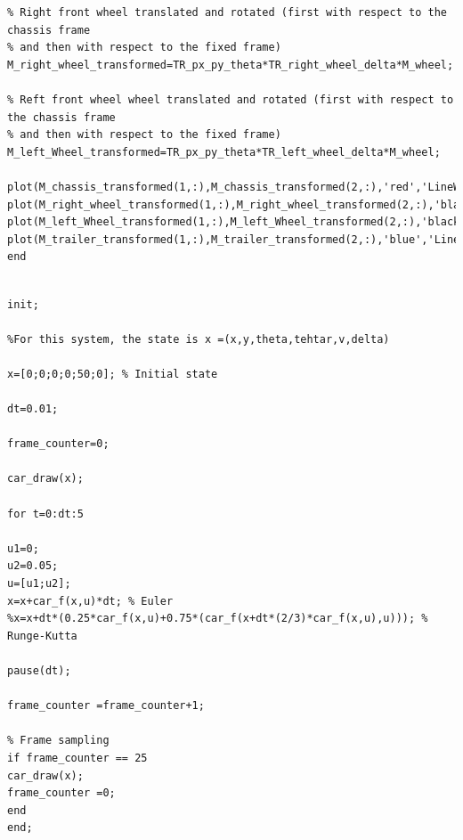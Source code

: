 \documentclass{article}
\begin{document}
\begin{tcolorbox}[
        title={File \texttt{car\_trailer\_draw.m}},
        width=13cm,
    ]
\begin{scriptsize}
\begin{verbatim}
% Right front wheel translated and rotated (first with respect to the chassis frame 
% and then with respect to the fixed frame)
M_right_wheel_transformed=TR_px_py_theta*TR_right_wheel_delta*M_wheel; 

% Reft front wheel wheel translated and rotated (first with respect to the chassis frame 
% and then with respect to the fixed frame)
M_left_Wheel_transformed=TR_px_py_theta*TR_left_wheel_delta*M_wheel; 

plot(M_chassis_transformed(1,:),M_chassis_transformed(2,:),'red','LineWidth',1);            
plot(M_right_wheel_transformed(1,:),M_right_wheel_transformed(2,:),'black','LineWidth',1);  
plot(M_left_Wheel_transformed(1,:),M_left_Wheel_transformed(2,:),'black','LineWidth',1);  
plot(M_trailer_transformed(1,:),M_trailer_transformed(2,:),'blue','LineWidth',1);
end

\end{verbatim}
\end{scriptsize}
\end{tcolorbox}



\bigskip

\noindent
    \begin{tcolorbox}[
        title={File \texttt{car\_trailer\_main.m}},
        width=13cm,
    ]
    
\begin{scriptsize}
\begin{verbatim}

init;

%For this system, the state is x =(x,y,theta,tehtar,v,delta)

x=[0;0;0;0;50;0]; % Initial state

dt=0.01;

frame_counter=0;

car_draw(x); 

for t=0:dt:5

u1=0;   
u2=0.05;  
u=[u1;u2];    
x=x+car_f(x,u)*dt; % Euler
%x=x+dt*(0.25*car_f(x,u)+0.75*(car_f(x+dt*(2/3)*car_f(x,u),u))); % Runge-Kutta

pause(dt);

frame_counter =frame_counter+1;

% Frame sampling
if frame_counter == 25
car_draw(x); 
frame_counter =0;
end
end;

\end{verbatim}
\end{scriptsize}
\end{tcolorbox}
\end{document}
